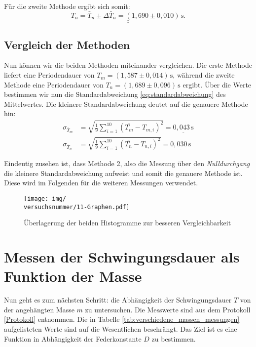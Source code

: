 Für die zweite Methode ergibt sich somit:
\begin{equation}
    \underline{\underline{T_{n} = \bar{T}_{n} \pm \Delta \bar{T}_{n} = (1,690 \pm 0,010)\,\mathrm{s}.}} 
\end{equation}

\subsection*{Vergleich der Methoden}
Nun können wir die beiden Methoden miteinander vergleichen. Die erste Methode liefert eine Periodendauer von $T_{m} = (1,587 \pm 0,014)\,\mathrm{s}$, während die zweite Methode eine Periodendauer von $T_{n} = (1,689 \pm 0,096)\,\mathrm{s}$ ergibt.
Über die Werte bestimmen wir nun die Standardabweichung \eqref{eq:standardabweichung} des Mittelwertes. Die kleinere Standardabweichung deutet auf die genauere Methode hin:
\begin{align}
    \sigma_{\bar{T}_m} &= \sqrt{\frac{1}{9} \sum_{i=1}^{10} (\bar{T_m}-T_{m,i})^2} = \underline{0,043\,\mathrm{s}} \\
    \sigma_{\bar{T}_n} &= \sqrt{\frac{1}{9} \sum_{i=1}^{10} (\bar{T_n}-T_{n,i})^2} = \underline{0,030\,\mathrm{s}}
\end{align}

Eindeutig zusehen ist, dass Methode 2, also die Messung über den \emph{Nulldurchgang} die kleinere Standardabweichung aufweist und somit die genauere Methode ist. Diese wird im Folgenden für die weiteren Messungen verwendet.

\begin{figure}[h!]
    \centering
    \texttt{[image: img/\\versuchsnummer/11-Graphen.pdf]}
    \caption{Überlagerung der beiden Histogramme zur besseren Vergleichbarkeit}
    \label{fig:histogramm_vergleich}
\end{figure}

\section{Messen der Schwingungsdauer als Funktion der Masse}
Nun geht es zum nächsten Schritt: die Abhängigkeit der Schwingungsdauer $T$ von der angehängten Masse $m$ zu untersuchen. Die Messwerte sind aus dem Protokoll \ref{Protokoll} entnommen. Die in Tabelle \ref{tab:verschiedene_massen_messungen} aufgelisteten Werte sind auf die Wesentlichen beschrängt.
Das Ziel ist es eine Funktion in Abhängigkeit der Federkonstante $D$ zu bestimmen.

